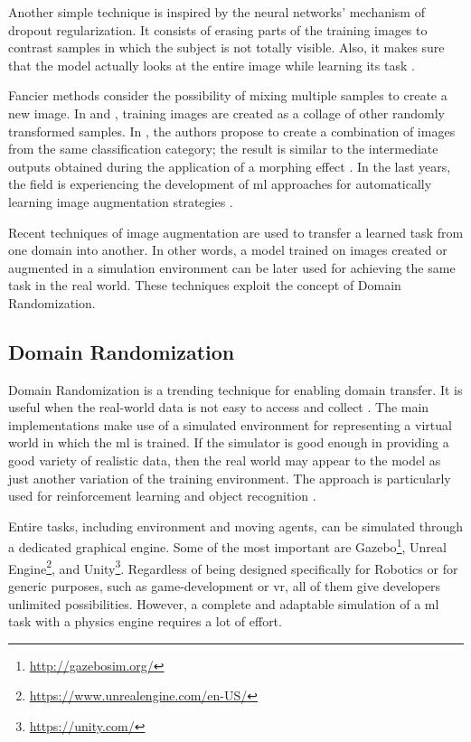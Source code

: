 Another simple technique is inspired by the neural networks' mechanism of dropout regularization. It consists of erasing parts of the training images to contrast samples in which the subject is not totally visible. Also, it makes sure that the model actually looks at the entire image while learning its task \cite{wan2013dropconn} \cite{zhong2017random}. 

Fancier methods consider the possibility of mixing multiple samples to create a new image. In \cite{Takahashi_2020} and \cite{summers2019improved}, training images are created as a collage of other randomly transformed samples. In \cite{Lemley_2017}, the authors propose to create a combination of images from the same classification category; the result is similar to the intermediate outputs obtained during the application of a morphing effect \cite{wiki_morphing}. In the last years, the field is experiencing the development of \gls{ml} approaches for automatically learning image augmentation strategies \cite{zoph2019learning} \cite{cubuk2019autoaugment}.

Recent techniques of image augmentation are used to transfer a learned task from one domain into another. In other words, a model trained on images created or augmented in a simulation environment can be later used for achieving the same task in the real world. These techniques exploit the concept of Domain Randomization.



\subsection{Domain Randomization}
\label{subsec:domain-randomization}

Domain Randomization is a trending technique for enabling domain transfer. It is useful when the real-world data is not easy to access and collect \cite{mehta2019active}. The main implementations make use of a simulated environment for representing a virtual world in which the \gls{ml} is trained. If the simulator is good enough in providing a good variety of realistic data, then the real world may appear to the model as just another variation of the training environment. The approach is particularly used for reinforcement learning \cite{imitation_learning_3d_navigation} and object recognition \cite{weng2019DR} \cite{tobin2017domain}.

Entire tasks, including environment and moving agents, can be simulated through a dedicated graphical engine. Some of the most important are Gazebo\footnote{\url{http://gazebosim.org/}}, Unreal Engine\footnote{\url{https://www.unrealengine.com/en-US/}}, and Unity\footnote{\url{https://unity.com/}}. Regardless of being designed specifically for Robotics or for generic purposes, such as game-development or \gls{vr}, all of them give developers unlimited possibilities. However, a complete and adaptable simulation of a \gls{ml} task with a physics engine requires a lot of effort.

